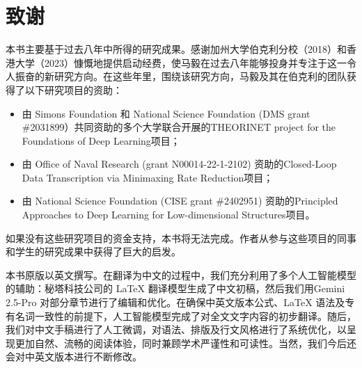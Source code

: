 \documentclass[../../book-main.tex]{subfiles}
\begin{document}
\chapter*{致谢}
本书主要基于过去八年中所得的研究成果。感谢加州大学伯克利分校（2018）和香港大学（2023）慷慨地提供启动经费，使马毅在过去八年能够投身并专注于这一令人振奋的新研究方向。在这些年里，围绕该研究方向，马毅及其在伯克利的团队获得了以下研究项目的资助：

\begin{itemize}
    \item 由 Simons Foundation 和 National Science Foundation (DMS grant \#2031899）共同资助的多个大学联合开展的THEORINET project for the Foundations of Deep Learning项目；%
    \item 由 Office of Naval Research (grant N00014-22-1-2102) 资助的Closed-Loop Data Transcription via Minimaxing Rate Reduction项目；%
    \item 由 National Science Foundation (CISE grant \#2402951) 资助的Principled Approaches to Deep Learning for Low-dimensional Structures项目。%
\end{itemize} 

如果没有这些研究项目的资金支持，本书将无法完成。作者从参与这些项目的同事和学生的研究成果中获得了巨大的启发。


本书原版以英文撰写。在翻译为中文的过程中，我们充分利用了多个人工智能模型的辅助：秘塔科技公司的 LaTeX 翻译模型生成了中文初稿，然后我们用Gemini 2.5-Pro 对部分章节进行了编辑和优化。在确保中英文版本公式、LaTeX 语法及专有名词一致性的前提下，人工智能模型完成了对全文文字内容的初步翻译。随后，我们对中文手稿进行了人工微调，对语法、排版及行文风格进行了系统优化，以呈现更加自然、流畅的阅读体验，同时兼顾学术严谨性和可读性。当然，我们今后还会对中英文版本进行不断修改。
\end{document}

